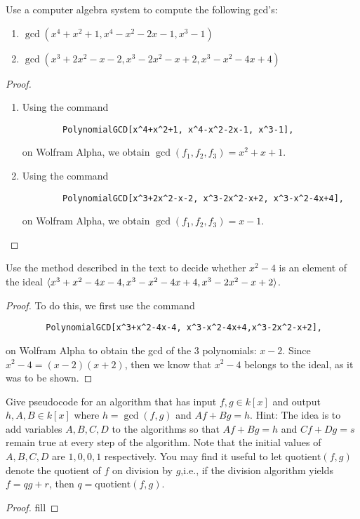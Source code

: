 \begin{exercise}{8}
Use a computer algebra system to compute the following gcd's:
\begin{enumerate}
    \item $\gcd(x^4+x^2+1, x^4-x^2-2x-1, x^3-1)$
    \item $\gcd(x^3+2x^2-x-2, x^3-2x^2-x+2, x^3-x^2-4x+4)$
\end{enumerate}
\end{exercise}
\begin{proof}
\begin{enumerate}
    \item Using the command 
    \begin{verbatim}
        PolynomialGCD[x^4+x^2+1, x^4-x^2-2x-1, x^3-1],
    \end{verbatim}
    on Wolfram Alpha, we obtain $\gcd(f_1, f_2, f_3)=x^2+x+1$.
    \item Using the command 
    \begin{verbatim}
        PolynomialGCD[x^3+2x^2-x-2, x^3-2x^2-x+2, x^3-x^2-4x+4],
    \end{verbatim}
    on Wolfram Alpha, we obtain $\gcd(f_1, f_2, f_3)=x-1$.
\end{enumerate}
\end{proof}

\begin{exercise}{9}
Use the method described in the text to decide whether $x^2-4$ is an element of the ideal $\langle x^3+x^2-4x-4, x^3-x^2-4x+4,x^3-2x^2-x+2\rangle$.
\end{exercise}
\begin{proof}
To do this, we first use the command 
\begin{verbatim}
        PolynomialGCD[x^3+x^2-4x-4, x^3-x^2-4x+4,x^3-2x^2-x+2],
\end{verbatim}
on Wolfram Alpha to obtain the gcd of the 3 polynomials: $x-2$. Since $x^2-4 = (x-2)(x+2)$, then we know that $x^2-4$ belongs to the ideal, as it was to be shown.
\end{proof}

\begin{exercise}{10}
Give pseudocode for an algorithm that has input $f,g\in k[x]$ and output $h,A,B\in k[x]$ where $h =\gcd(f,g)$ and $Af+Bg=h$. Hint: The idea is to add variables $A,B,C,D$ to the algorithms so that $Af+Bg =h$ and $Cf+Dg =s$ remain true at every step of the algorithm. Note that the initial values of $A,B,C,D$ are $1,0,0,1$ respectively. You may find it useful to let $\text{quotient}(f,g)$ denote the quotient of $f$ on division by $g$,i.e., if the division algorithm yields $f =qg+r$, then $q =\text{quotient}(f,g)$.
\end{exercise}
\begin{proof}
fill
\end{proof}

